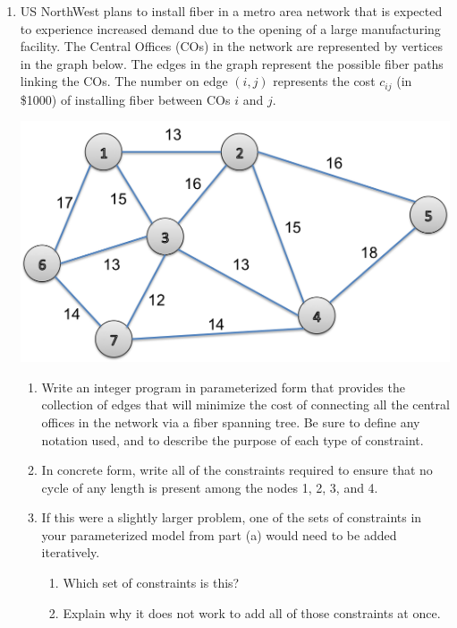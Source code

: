\documentclass[letterpaper,oneside,12pt]{article}%
\begin{document}
\noindent{}

\bigskip

\begin{enumerate}
\item US NorthWest plans to install fiber in a metro area network that is expected to experience increased demand due to the opening of a large manufacturing facility.  The Central Offices (COs) in the network are represented by vertices in the graph below.  The edges in the graph represent the possible fiber paths linking the COs.  The number on edge $(i,j)$ represents the cost $c_{ij}$ (in \$1000) of installing fiber between COs $i$ and $j$.

\begin{center}
\includegraphics[width = .5\textwidth]{uswest_network}
\end{center}

\begin{enumerate}
\item Write an integer program in parameterized form that provides the collection of edges that will minimize the cost of connecting all the central offices in the network via a fiber spanning tree.  Be sure to define any notation used, and to describe the purpose of each type of constraint.


\item  In concrete form, write all of the constraints required to ensure that no cycle of any length is present among the nodes 1, 2, 3, and 4. 

\item  If this were a slightly larger problem, one of the sets of constraints in your parameterized model from part (a) would need to be added iteratively.  
\begin{enumerate}
\item  Which set of constraints is this?

\item  Explain why it does not work to add all of those constraints at once.


\end{enumerate}
\end{enumerate}
\end{enumerate}
\end{document}
